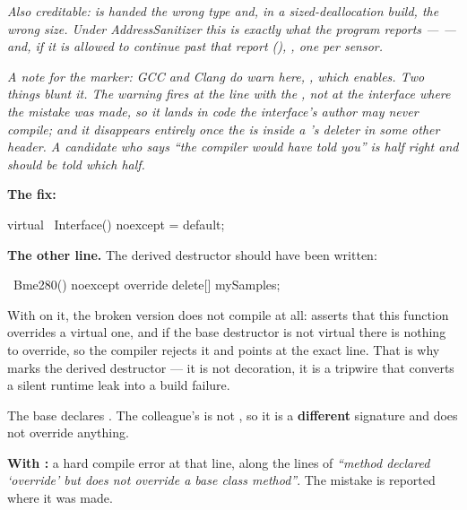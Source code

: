 \textit{Also creditable:  is handed the wrong type and, in a sized-deallocation
build, the wrong size. Under AddressSanitizer this is exactly what the program reports ---
 --- and, if it is allowed to continue past that report
(), , one
 per sensor.}

\textit{A note for the marker: GCC and Clang do warn here, , which
 enables. Two things blunt it. The warning fires at the line with the , not
at the interface where the mistake was made, so it lands in code the interface's author may never
compile; and it disappears entirely once the  is inside a 's
deleter in some other header. A candidate who says ``the compiler would have told you'' is half
right and should be told which half.}

\textbf{The fix:}

\begin{cppcode}
virtual ~Interface() noexcept = default;
\end{cppcode}

\textbf{The other line.} The derived destructor should have been written:

\begin{cppcode}
~Bme280() noexcept override { delete[] mySamples; }
\end{cppcode}

\noindent With  on it, the broken version does not compile at all: 
asserts that this function overrides a virtual one, and if the base destructor is not virtual there
is nothing to override, so the compiler rejects it and points at the exact line. That is why
 marks the derived destructor  --- it is not decoration, it is a
tripwire that converts a silent runtime leak into a build failure. 

The base declares . The colleague's  is not , so it is a
\textbf{different} signature and does not override anything.

\textbf{With :} a hard compile error at that line, along the lines of \emph{``method
declared `override' but does not override a base class method''}. The mistake is reported where it
was made. 

